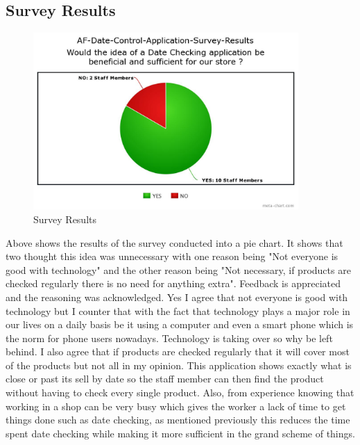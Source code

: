 \subsection{Survey Results}

\begin{figure}[h!]
	\caption{Survey Results}
	\label{image:surveyResults}
	\centering
	\includegraphics[width=0.9\textwidth]{images/AF-Date-Control-Survey-Results.jpeg}
\end{figure}

Above shows the results of the survey conducted into a pie chart. It shows that two thought this idea was unnecessary with one reason being "Not everyone is good with technology" and the other reason being "Not necessary, if products are checked regularly there is no need for anything extra". Feedback is appreciated and the reasoning was acknowledged. Yes I agree that not everyone is good with technology but I counter that with the fact that technology plays a major role in our lives on a daily basis be it using a computer and even a smart phone which is the norm for phone users nowadays. Technology is taking over so why be left behind. I also agree that if products are checked regularly that it will cover most of the products but not all in my opinion. This application shows exactly what is close or past its sell by date so the staff member can then find the product without having to check every single product. Also, from experience knowing that working in a shop can be very busy which gives the worker a lack of time to get things done such as date checking, as mentioned previously this reduces the time spent date checking while making it more sufficient in the grand scheme of things. 
\newpage
